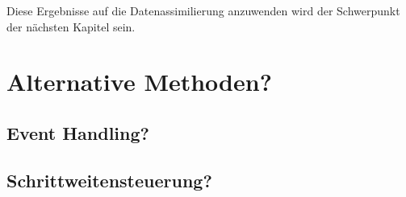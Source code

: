 
Diese Ergebnisse auf die Datenassimilierung anzuwenden wird der Schwerpunkt der nächsten Kapitel sein.
%   
\section{Alternative Methoden?}
\subsection{Event Handling?}
\subsection{Schrittweitensteuerung?}